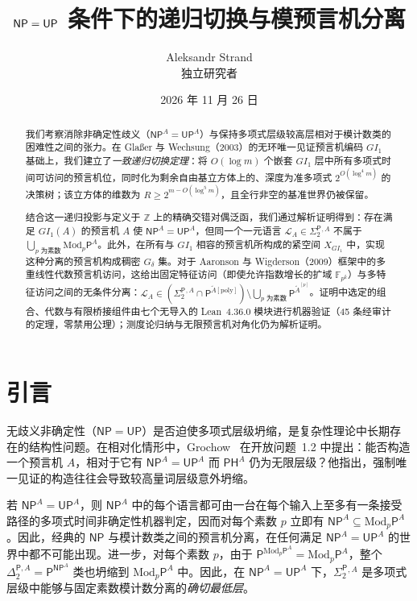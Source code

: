 \documentclass[11pt,a4paper]{article}
\title{\textbf{$\NP = \UP$ 条件下的递归切换与模预言机分离}}
\author{Aleksandr Strand\\ \small 独立研究者}
\date{2026 年 11 月 26 日}
\theoremstyle{definition}
\theoremstyle{remark}
\newcommand{\Pcl}{\mathsf{P}}
\newcommand{\NP}{\mathsf{NP}}
\newcommand{\UP}{\mathsf{UP}}
\newcommand{\PH}{\mathsf{PH}}
\newcommand{\Modp}{\mathrm{Mod}_p\mathsf{P}}
\newcommand{\SigTwo}{\Sigma_2^{\mathsf{P}}}
\newcommand{\F}{\mathbb{F}}
\newcommand{\Z}{\mathbb{Z}}
\newcommand{\GI}{GI_1}
\begin{document}
\maketitle

\begin{abstract}
我们考察消除非确定性歧义（$\NP^A = \UP^A$）与保持多项式层级较高层相对于模计数类的困难性之间的张力。在 Gla\ss er 与 Wechsung（2003）的无环唯一见证预言机编码 $\GI$ 基础上，我们建立了\emph{一致递归切换定理}：将 $O(\log m)$ 个嵌套 $\GI$ 层中所有多项式时间可访问的预言机位，同时化为剩余自由基立方体上的、深度为准多项式 $2^{O(\log^4 m)}$ 的决策树；该立方体的维数为 $R \ge 2^{m - O(\log^5 m)}$，且全行非空的基准世界仍被保留。

结合这一递归投影与定义于 $\Z$ 上的精确交错对偶泛函，我们通过解析证明得到：存在满足 $\GI(A)$ 的预言机 $A$ 使 $\NP^A = \UP^A$，但同一个一元语言 $\mathcal{L}_A \in \SigTwo{}^{,A}$ 不属于 $\bigcup_{p\text{ 为素数}} \Modp^A$。此外，在所有与 $\GI$ 相容的预言机所构成的紧空间 $X_{\GI}$ 中，实现这种分离的预言机构成稠密 $G_\delta$ 集。对于 Aaronson 与 Wigderson（2009）框架中的多重线性代数预言机访问，这给出固定特征访问（即使允许指数增长的扩域 $\F_{p^k}$）与多特征访问之间的无条件分离：$\mathcal{L}_A \in (\SigTwo{}^{,A} \cap \Pcl^{\widetilde{A}[\mathrm{poly}]}) \setminus \bigcup_{p\text{ 为素数}} \Pcl^{\widetilde{A}^{[p]}}$。证明中选定的组合、代数与有限桥接组件由七个无导入的 Lean~4.36.0 模块进行机器验证（45 条经审计的定理，零禁用公理）；测度论归纳与无限预言机对角化仍为解析证明。
\end{abstract}

\section{引言}

无歧义非确定性（$\NP = \UP$）是否迫使多项式层级坍缩，是复杂性理论中长期存在的结构性问题。在相对化情形中，Grochow~\cite{Grochow2023} 在开放问题~1.2 中提出：能否构造一个预言机 $A$，相对于它有 $\NP^A = \UP^A$ 而 $\PH^A$ 仍为无限层级？他指出，强制唯一见证的构造往往会导致较高量词层级意外坍缩。

若 $\NP^A = \UP^A$，则 $\NP^A$ 中的每个语言都可由一台在每个输入上至多有一条接受路径的多项式时间非确定性机器判定，因而对每个素数 $p$ 立即有 $\NP^A \subseteq \Modp^A$。因此，经典的 $\NP$ 与模计数类之间的预言机分离，在任何满足 $\NP^A = \UP^A$ 的世界中都不可能出现。进一步，对每个素数 $p$，由于 $\Pcl^{\Modp^A} = \Modp^A$，整个 $\Delta_2^{\Pcl,A} = \Pcl^{\NP^A}$ 类也坍缩到 $\Modp^A$ 中。因此，在 $\NP^A = \UP^A$ 下，$\SigTwo{}^{,A}$ 是多项式层级中能够与固定素数模计数分离的\emph{确切最低层}。
\end{document}
